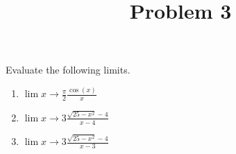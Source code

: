 \documentclass{ximera}
\title[Problem 3]{Problem 3}
\begin{document}
\begin{abstract} \end{abstract}
\maketitle

\begin{problem}
Evaluate the following limits.
	\begin{enumerate}
		\item $ \displaystyle \lim{x \to \frac{\pi}{2}} \frac{\cos{(x)}}{x}  $
	\item	$\displaystyle \lim{x \to 3} \frac{\sqrt{25-x^2 }-4}{x-4} $\\
	\item	$\displaystyle \lim{x \to 3} \frac{\sqrt{25-x^2 }-4}{x-3} $\\
	\end{enumerate}
\end{problem}
\end{document}
